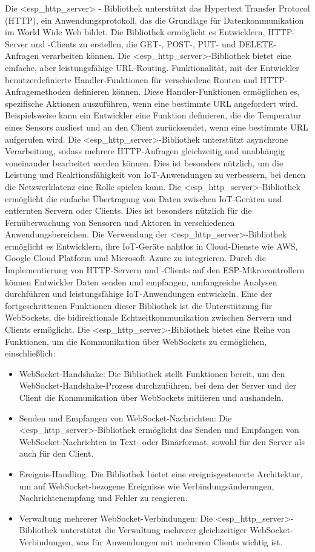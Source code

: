Die <esp\_http\_server> - Bibliothek unterstützt das Hypertext Transfer Protocol (HTTP), ein Anwendungsprotokoll, das die Grundlage für Datenkommunikation im World Wide Web bildet. 
Die Bibliothek ermöglicht es Entwicklern, HTTP-Server und -Clients zu erstellen, die GET-, POST-, PUT- und DELETE-Anfragen verarbeiten können.
Die <esp\_http\_server>-Bibliothek bietet eine einfache, aber leistungsfähige URL-Routing.
Funktionalität, mit der Entwickler benutzerdefinierte Handler-Funktionen für verschiedene Routen und HTTP-Anfragemethoden definieren können. 
Diese Handler-Funktionen ermöglichen es, spezifische Aktionen auszuführen, wenn eine bestimmte URL angefordert wird. 
Beispielsweise kann ein Entwickler eine Funktion definieren, die die Temperatur eines Sensors ausliest und an den Client zurücksendet, wenn eine bestimmte URL aufgerufen wird.
Die <esp\_http\_server>-Bibliothek unterstützt asynchrone Verarbeitung, sodass mehrere HTTP-Anfragen gleichzeitig und unabhängig voneinander bearbeitet werden können. 
Dies ist besonders nützlich, um die Leistung und Reaktionsfähigkeit von IoT-Anwendungen zu verbessern, bei denen die Netzwerklatenz eine Rolle spielen kann.
Die <esp\_http\_server>-Bibliothek ermöglicht die einfache Übertragung von Daten zwischen IoT-Geräten und entfernten Servern oder Clients. 
\newline
Dies ist besonders nützlich für die Fernüberwachung von Sensoren und Aktoren in verschiedenen Anwendungsbereichen.
Die Verwendung der <esp\_http\_server>-Bibliothek ermöglicht es Entwicklern, ihre IoT-Geräte nahtlos in Cloud-Dienste wie AWS, Google Cloud Platform und Microsoft Azure zu integrieren. 
Durch die Implementierung von HTTP-Servern und -Clients auf den ESP-Mikrocontrollern können Entwickler Daten senden und empfangen, umfangreiche Analysen durchführen und leistungsfähige IoT-Anwendungen entwickeln.
Eine der fortgeschrittenen Funktionen dieser Bibliothek ist die Unterstützung für WebSockets, die bidirektionale Echtzeitkommunikation zwischen Servern und Clients ermöglicht.
Die <esp\_http\_server>-Bibliothek bietet eine Reihe von Funktionen, um die Kommunikation über WebSockets zu ermöglichen, einschließlich:
\begin{itemize}
    \item WebSocket-Handshake: Die Bibliothek stellt Funktionen bereit, um den WebSocket-Handshake-Prozess durchzuführen, bei dem der Server und der Client die Kommunikation über WebSockets initiieren und aushandeln.
    \item Senden und Empfangen von WebSocket-Nachrichten: Die <esp\_http\_server>-Bibliothek ermöglicht das Senden und Empfangen von WebSocket-Nachrichten in Text- oder Binärformat, sowohl für den Server als auch für den Client.
    \item Ereignis-Handling: Die Bibliothek bietet eine ereignisgesteuerte Architektur, um auf WebSocket-bezogene Ereignisse wie Verbindungsänderungen, Nachrichtenempfang und Fehler zu reagieren.
    \item Verwaltung mehrerer WebSocket-Verbindungen: Die <esp\_http\_server>-Bibliothek unterstützt die Verwaltung mehrerer gleichzeitiger WebSocket-Verbindungen, was für Anwendungen mit mehreren Clients wichtig ist.
\end{itemize}

